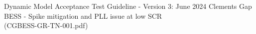 \renewcommand\bibname{References}

\begin{thebibliography}{99}
	Dynamic Model Acceptance Test Guideline - Version 3: June 2024
	Clements Gap BESS - Spike mitigation and PLL issue at low SCR\\
	(CGBESS-GR-TN-001.pdf)
	
\end{thebibliography}